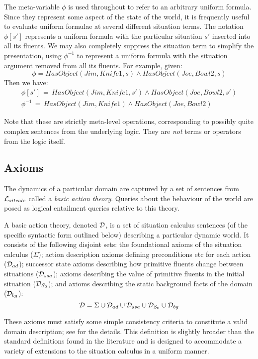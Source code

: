 The meta-variable $\phi$ is used throughout to refer to an arbitrary
uniform formula. Since they represent some aspect of the state of
the world, it is frequently useful to evaluate uniform formulae at
several different situation terms. The notation $\phi[s']$ represents
a uniform formula with the particular situation $s'$ inserted into
all its fluents. We may also completely suppress the situation term
to simplify the presentation, using $\phi^{-1}$ to represent a uniform
formula with the situation argument removed from all its fluents.
For example, given: \[
\phi=HasObject(Jim,Knife1,s)\wedge HasObject(Joe,Bowl2,s)\]
 Then we have:\begin{gather*}
\phi[s']\,=\, HasObject(Jim,Knife1,s')\wedge HasObject(Joe,Bowl2,s')\\
\phi^{-1}\,=\, HasObject(Jim,Knife1)\wedge HasObject(Joe,Bowl2)\end{gather*}


Note that these are strictly meta-level operations, corresponding
to possibly quite complex sentences from the underlying logic. They
are \emph{not} terms or operators from the logic itself.


\subsection{Axioms\label{sec:Background:SC:Axioms}}

The dynamics of a particular domain are captured by a set of sentences
from $\mathcal{L}_{sitcalc}$ called a \emph{basic action theory}. Queries about the
behaviour of the world are posed as logical entailment queries relative
to this theory.

\begin{defnL}
 A basic action theory, denoted
$\mathcal{D}$, is a set of situation calculus sentences (of the specific
syntactic form outlined below) describing a particular dynamic world.
It consists of the following disjoint sets: the foundational axioms
of the situation calculus ($\Sigma$); action description axioms defining
preconditions etc for each action ($\mathcal{D}_{ad}$); successor state axioms
describing how primitive fluents change between situations ($\mathcal{D}_{ssa}$);
axioms describing the value of primitive fluents in the initial situation
($\mathcal{D}_{S_{0}}$); and axioms describing the static background facts
of the domain ($\mathcal{D}_{bg}$):\[
\mathcal{D}=\Sigma\cup\mathcal{D}_{ad}\cup\mathcal{D}_{ssa}\cup\mathcal{D}_{S_{0}}\cup\mathcal{D}_{bg}\]

\end{defnL}
These axioms must satisfy some simple consistency criteria to constitute
a valid domain description; see \citep{pirri99contributions_sitcalc}
for the details. This definition is slightly broader than the standard
definitions found in the literature \citep{levesque98sc_foundations,pirri99contributions_sitcalc,reiter01kia}
and is designed to accommodate a variety of extensions to the situation
calculus in a uniform manner.

